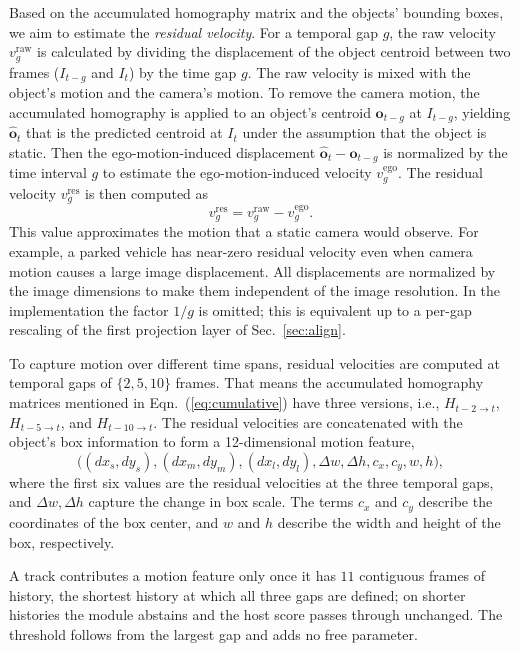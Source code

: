 \documentclass{article}
\begin{document}
Based on the accumulated homography matrix and the objects' bounding boxes, we aim to estimate the \emph{residual velocity}. For a temporal gap $g$, the raw velocity $v^{\mathrm{raw}}_{g}$ is calculated by dividing the displacement of the object centroid between two frames ($I_{t-g}$ and $I_{t}$) by the time gap $g$. The raw velocity is mixed with the object's motion and the camera's motion. To remove the camera motion, the accumulated homography is applied to an object's centroid $\boldsymbol{o}_{t-g}$ at $I_{t-g}$, yielding $\hat{\boldsymbol{o}}_{t}$ that is the predicted centroid at $I_{t}$ under the assumption that the object is static. Then the ego-motion-induced displacement $\hat{\boldsymbol{o}}_{t}-\boldsymbol{o}_{t-g}$ is normalized by the time interval $g$ to estimate the ego-motion-induced velocity $v^{\mathrm{ego}}_{g}$. The residual velocity $v^{\mathrm{res}}_{g}$ is then computed as
\begin{equation}
  v^{\mathrm{res}}_{g} = v^{\mathrm{raw}}_{g} - v^{\mathrm{ego}}_{g}.
  \label{eq:residual}
\end{equation}
This value approximates the motion that a static camera would observe. For example, a parked vehicle has near-zero residual velocity even when camera motion causes a large image displacement. All displacements are normalized by the image dimensions to make them independent of the image resolution. In the implementation the factor $1/g$ is omitted; this is equivalent up to a per-gap rescaling of the first projection layer of Sec.~\ref{sec:align}.

To capture motion over different time spans, residual velocities are computed at temporal gaps of $\{2,5,10\}$ frames. That means the accumulated homography matrices mentioned in Eqn.~(\ref{eq:cumulative}) have three versions, i.e., $H_{t-2 \to t}$, $H_{t-5 \to t}$, and $H_{t-10 \to t}$. The residual velocities are concatenated with the object's box information to form a 12-dimensional motion feature,
\begin{equation}
  \bigl((dx_s,dy_s),(dx_m,dy_m),(dx_l,dy_l),\Delta w,\Delta h,c_x,c_y,w,h\bigr),
  \label{eq:descriptor}
\end{equation}
where the first six values are the residual velocities at the three temporal gaps, and $\Delta w, \Delta h$ capture the change in box scale. The terms $c_x$ and $c_y$ describe the coordinates of the box center, and $w$ and $h$ describe the width and height of the box, respectively.

A track contributes a motion feature only once it has $11$ contiguous frames of history, the shortest history at which all three gaps are defined; on shorter histories the module abstains and the host score passes through unchanged. The threshold follows from the largest gap and adds no free parameter.
\end{document}
